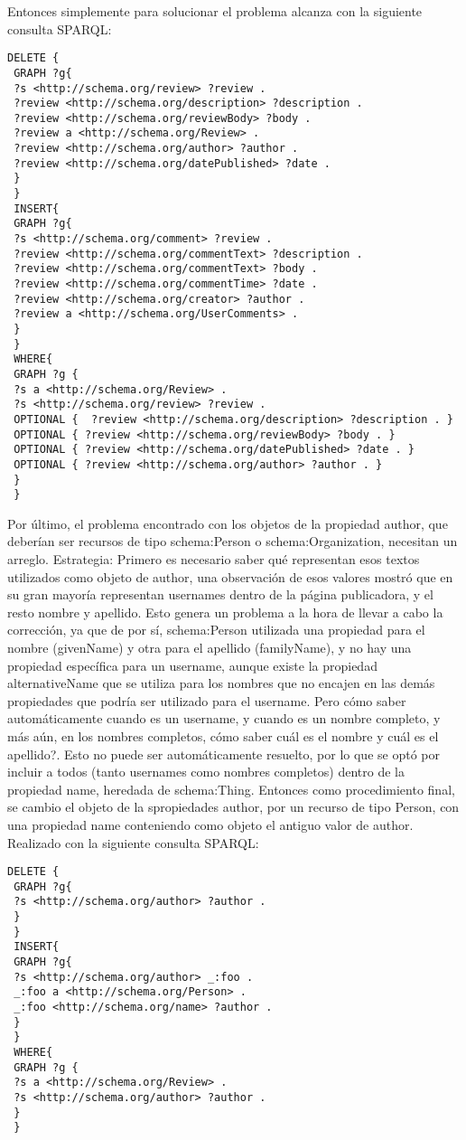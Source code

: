 Entonces simplemente para solucionar el problema alcanza con la siguiente consulta SPARQL:\\
\begin{lstlisting}[frame=single]
 DELETE { 
 GRAPH ?g{ 
 ?s <http://schema.org/review> ?review .
 ?review <http://schema.org/description> ?description .
 ?review <http://schema.org/reviewBody> ?body .
 ?review a <http://schema.org/Review> .
 ?review <http://schema.org/author> ?author . 
 ?review <http://schema.org/datePublished> ?date .
 } 
 } 
 INSERT{ 
 GRAPH ?g{ 
 ?s <http://schema.org/comment> ?review .
 ?review <http://schema.org/commentText> ?description .
 ?review <http://schema.org/commentText> ?body .
 ?review <http://schema.org/commentTime> ?date .
 ?review <http://schema.org/creator> ?author .
 ?review a <http://schema.org/UserComments> .
 }
 }
 WHERE{
 GRAPH ?g {
 ?s a <http://schema.org/Review> .
 ?s <http://schema.org/review> ?review .
 OPTIONAL {  ?review <http://schema.org/description> ?description . }
 OPTIONAL { ?review <http://schema.org/reviewBody> ?body . }
 OPTIONAL { ?review <http://schema.org/datePublished> ?date . }
 OPTIONAL { ?review <http://schema.org/author> ?author . }
 }
 }
\end{lstlisting}

Por último, el problema encontrado con los objetos de la propiedad author, que deberían ser recursos de tipo schema:Person o schema:Organization, 
necesitan un arreglo.
Estrategia: 
Primero es necesario saber qué representan esos textos utilizados como objeto de author, una observación de esos valores mostró que 
en su gran mayoría representan usernames dentro de la página publicadora, y el resto nombre y apellido.
Esto genera un problema a la hora de llevar a cabo la corrección, ya que de por sí, schema:Person utilizada una propiedad para el nombre (givenName) 
y otra para el apellido (familyName), y no hay una propiedad específica para un username, aunque existe la propiedad alternativeName que 
se utiliza para los nombres que no encajen en las demás propiedades que podría ser utilizado para el username.
Pero cómo saber automáticamente cuando es un username, y cuando es un nombre completo, y más aún, en los nombres completos, cómo saber cuál es el nombre y 
cuál es el apellido?.
Esto no puede ser automáticamente resuelto, por lo que se optó por incluir a todos (tanto usernames como nombres completos) dentro de la propiedad name, heredada de 
schema:Thing.
Entonces como procedimiento final, se cambio el objeto de la spropiedades author, por un recurso de tipo Person, con una propiedad name conteniendo 
como objeto el antiguo valor de author. Realizado con la siguiente consulta SPARQL:\\
\begin{lstlisting}[frame=single]
 DELETE { 
 GRAPH ?g{ 
 ?s <http://schema.org/author> ?author .
 } 
 } 
 INSERT{ 
 GRAPH ?g{ 
 ?s <http://schema.org/author> _:foo .
 _:foo a <http://schema.org/Person> .
 _:foo <http://schema.org/name> ?author .
 }
 }
 WHERE{
 GRAPH ?g {
 ?s a <http://schema.org/Review> .
 ?s <http://schema.org/author> ?author .
 }
 }
\end{lstlisting}